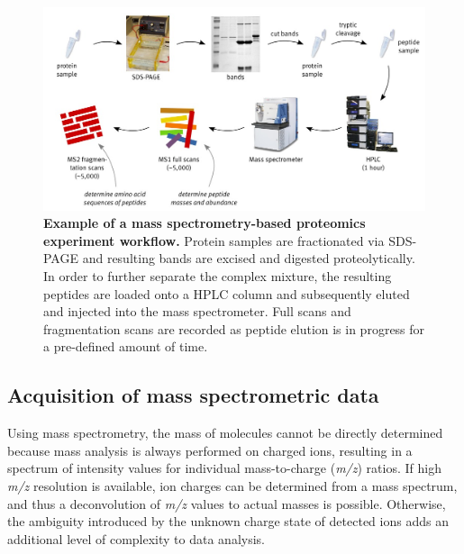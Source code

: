 \begin{figure}
\includegraphics[width=\textwidth]{figures/Proteomics.jpg}
\caption{
{\bf Example of a mass spectrometry-based proteomics experiment workflow.} 
Protein samples are fractionated via SDS-PAGE and resulting bands are excised and
digested proteolytically. In order to further separate the complex mixture, 
the resulting peptides are loaded onto a HPLC column and subsequently eluted 
and injected into the mass spectrometer. Full scans and fragmentation scans
are recorded as peptide elution is in progress for a pre-defined amount of time.
}
\label{fig:proteomics-overview}
\end{figure}

\subsection{Acquisition of mass spectrometric data}

Using mass spectrometry, the mass of molecules cannot be directly determined
because mass analysis is always performed on charged ions, resulting in a 
spectrum of intensity values for individual mass-to-charge ({\em m/z}) ratios.
If high {\em m/z} resolution is available, ion charges can be determined 
from a mass spectrum, and thus a deconvolution of {\em m/z} values to actual 
masses is possible.
Otherwise, the ambiguity introduced by the unknown charge state of detected
ions adds an additional level of complexity to data analysis.


